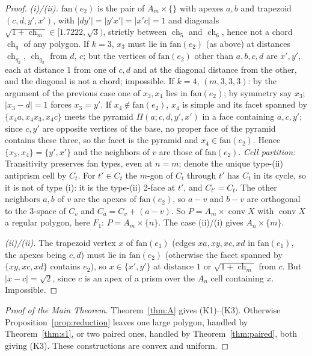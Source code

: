 \documentclass[11pt]{article}
\theoremstyle{definition}
\theoremstyle{remark}
\newcommand{\conv}{\operatorname{conv}}
\newcommand{\ch}{\operatorname{ch}}
\begin{document}
\begin{proof}
\emph{(i)/(ii).} $\mathrm{fan}(e_2)$ is the pair of $A_m\times\{\}$ with
apexes $a,b$ and trapezoid $(c,d,y',x')$, with $|dy'|=|y'x'|=|x'c|=1$ and
diagonals $\sqrt{1+\ch_m}\in[1.7222,\sqrt3)$, strictly between $\ch_5$ and
$\ch_6$, hence not a chord $\ch_q$ of any polygon. If $k=3$, $x_3$ must lie in
$\mathrm{fan}(e_2)$ (as above) at distances $\ch_{q_2}$, $\ch_{q_3}$ from $d$,
$c$; but the vertices of $\mathrm{fan}(e_2)$ other than $a,b,c,d$ are $x',y'$,
each at distance $1$ from one of $c,d$ and at the diagonal distance from the
other, and the diagonal is not a chord; impossible. If
$k=4$, $(m,3,3,3)$: by the argument of the previous case one of $x_3,x_4$
lies in $\mathrm{fan}(e_2)$; by symmetry say $x_3$; $|x_3-d|=1$ forces
$x_3=y'$. If $x_4\notin\mathrm{fan}(e_2)$, $x_4$ is simple and its facet
spanned by $\{x_4a,x_4x_3,x_4c\}$ meets the pyramid $\Pi(a;c,d,y',x')$ in a
face containing $a,c,y'$; since $c,y'$ are opposite vertices of the base, no
proper face of the pyramid contains these three, so the facet is the
pyramid and $x_4\in\mathrm{fan}(e_2)$. Hence $\{x_3,x_4\}=\{y',x'\}$ and the
neighbors of $v$ are those of $\mathrm{fan}(e_2)$. \emph{Cell partition:}
Transitivity preserves fan types, even at $n=m$; denote the unique type-(ii) antiprism cell by $C_t$. For $t'\in C_t$ the $m$-gon of $C_t$ through $t'$ has $C_t$ in its
cycle, so it is not of type (i): it is the type-(ii) 2-face at $t'$, and
$C_{t'}=C_t$. The other neighbors $a,b$ of $v$ are the apexes of
$\mathrm{fan}(e_2)$, so $a-v$ and $b-v$ are orthogonal to the 3-space of
$C_v$ and $C_a=C_v+(a-v)$. So $P=A_m\times\conv X$ with $\conv X$ a regular
polygon, here $F_1$: $P=A_m\times\{n\}$. The case (ii)/(i) gives
$A_n\times\{m\}$.

\emph{(ii)/(ii).} The trapezoid vertex $x$ of $\mathrm{fan}(e_1)$ (edges
$xa,xy,xc,xd$ in $\mathrm{fan}(e_1)$, the apexes being $c,d$) must lie in
$\mathrm{fan}(e_2)$ (otherwise the facet spanned by $\{xy,xc,xd\}$ contains
$e_2$), so $x\in\{x',y'\}$ at distance $1$ or $\sqrt{1+\ch_m}$ from $c$. But
$|x-c|=\sqrt2$, since $c$ is an apex of a prism over the $A_n$ cell
containing $x$. Impossible.
\end{proof}



\begin{proof}[Proof of the Main Theorem]
Theorem~\ref{thm:A} gives (K1)--(K3). Otherwise Proposition~\ref{prop:reduction}
leaves one large polygon, handled by Theorem~\ref{thm:s1}, or two paired
ones, handled by Theorem~\ref{thm:paired}, both giving (K3).
These constructions are convex and uniform.
\end{proof}
\end{document}

